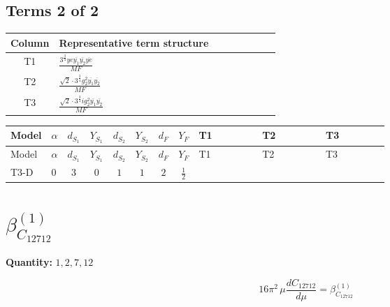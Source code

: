 \documentclass[8pt]{article}
\begin{document}
\begin{landscape}
\subsection*{Terms 2 of 2}
\begin{center}
\begin{tabular}{@{}c >{\raggedright\arraybackslash}p{0.82\linewidth}@{}}
\toprule
Column & Representative term structure \\
\midrule
T1 & \(\displaystyle \frac{3^{\frac{3}{4}} ye \overline{y_{1}} \overline{y_{2}} \overline{ye}}{MF}\) \\
\midrule
T2 & \(\displaystyle \frac{\sqrt{2} \cdot 3^{\frac{3}{4}} g_{2}^{2} \overline{y_{1}} \overline{y_{2}}}{MF}\) \\
\midrule
T3 & \(\displaystyle \frac{\sqrt{2} \cdot 3^{\frac{3}{4}} i g_{2}^{2} \overline{y_{1}} \overline{y_{2}}}{MF}\) \\
\midrule
\bottomrule
\end{tabular}
\end{center}
\smallskip
\tiny
\begin{longtable}{@{}llcccccc >{\raggedright\arraybackslash}p{0.21\linewidth} >{\raggedright\arraybackslash}p{0.21\linewidth} >{\raggedright\arraybackslash}p{0.21\linewidth}@{}}
\toprule
Model & $\alpha$ & $d_{S_1}$ & $Y_{S_1}$ & $d_{S_2}$ & $Y_{S_2}$ & $d_F$ & $Y_F$ & T1 & T2 & T3 \\
\midrule
\endfirsthead
\toprule
Model & $\alpha$ & $d_{S_1}$ & $Y_{S_1}$ & $d_{S_2}$ & $Y_{S_2}$ & $d_F$ & $Y_F$ & T1 & T2 & T3 \\
\midrule
\endhead
T3-D & $0$ & $3$ & $0$ & $1$ & $1$ & $2$ & $\frac{1}{2}$ & \scriptsize\adjustbox{max width=\linewidth}{$\begin{gathered} - \frac{3^{\frac{3}{4}} ye \overline{y_{1}} \overline{y_{2}} \overline{ye}}{12 MF}\end{gathered}$} & \scriptsize\adjustbox{max width=\linewidth}{$\begin{gathered} \frac{\sqrt{2} \cdot 3^{\frac{3}{4}} g_{2}^{2} \overline{y_{1}} \overline{y_{2}}}{6 MF}\end{gathered}$} & \scriptsize\adjustbox{max width=\linewidth}{$\begin{gathered} \frac{\sqrt{2} \cdot 3^{\frac{3}{4}} i g_{2}^{2} \overline{y_{1}} \overline{y_{2}}}{6 MF}\end{gathered}$} \\
\midrule
\bottomrule
\end{longtable}
\clearpage
\section*{$\beta_{C_{12712}}^{(1)}$}
\noindent\textbf{Quantity: }$\mathrm{1,2,7,12}$\par\smallskip
\[16\pi^2\,\mu\frac{d C_{12712}}{d\mu}=\beta_{C_{12712}}^{(1)}\]

\end{landscape}
\end{document}

